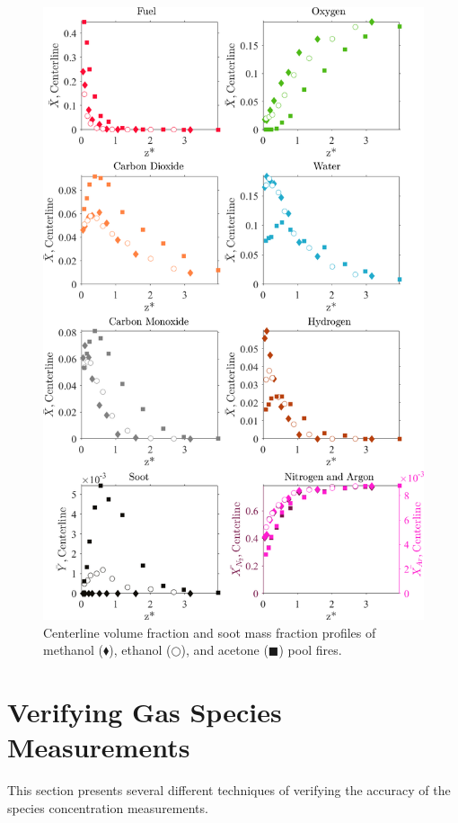 \documentclass[12pt]{article}
\begin{document}
\begin{figure}[!]
	\centering
\includegraphics[width=12.5cm,keepaspectratio]{OVERALL_Fuel_Comparison.png}
	\caption[Major Species Comparison]{Centerline volume fraction and soot mass fraction profiles of methanol ($\blacklozenge$), ethanol ($\bigcirc$), and acetone ($\blacksquare$) pool fires.}
	\label{fig:Fuel_Comparison}
\end{figure}


\clearpage

\section{Verifying Gas Species Measurements}
\label{ssec:Verifying_Vol_Frac_Measurements}

This section presents several different techniques of verifying the accuracy of the species concentration measurements. 
\end{document}

